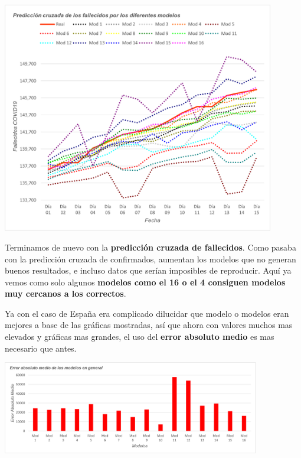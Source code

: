 \documentclass[12pt,a4paper, xcolor=table]{article}
\begin{document}
            \begin{center}
                \centering
                \includegraphics[width=450px]{img/pred_c_fall_BZ.png}
            \end{center}
                
            Terminamos de nuevo con la \textbf{predicción cruzada de fallecidos}. Como pasaba con la predicción cruzada de confirmados, aumentan los modelos que no generan buenos resultados, e incluso datos que serían imposibles de reproducir. Aquí ya vemos como solo algunos \textbf{modelos como el 16 o el 4 consiguen modelos muy cercanos a los correctos}.
            
            \newpage
            
            Ya con el caso de España era complicado dilucidar que modelo o modelos eran mejores a base de las gráficas mostradas, así que ahora con valores muchos mas elevados y gráficas mas grandes, el uso del \textbf{error absoluto medio} es mas necesario que antes.
            
            \begin{center}
                \centering
                \includegraphics[width=425px]{img/eam_BZ_parte2.png}
            \end{center}
            
\end{document}
